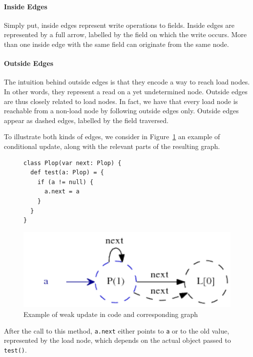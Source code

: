 \paragraph{Inside Edges} Simply put, inside edges represent write operations to
fields. Inside edges are represented by a full arrow, labelled by the field on
which the write occurs. More than one inside edge with the same field can
originate from the same node.

\paragraph{Outside Edges} The intuition behind outside edges is that they
encode a way to reach load nodes. In other words, they represent a read on a
yet undetermined node. Outside edges are thus closely related to load nodes. In
fact, we have that every load node is reachable from a non-load node by
following outside edges only. Outside edges appear as dashed edges, labelled by
the field traversed.

To illustrate both kinds of edges, we consider in Figure~\ref{fig:pt:weak1graph} an
example of conditional update, along with the relevant parts of the resulting graph.
\begin{figure}[h]
\begin{minipage}[tl]{0.6\linewidth}
    \centering
\lstset{linewidth=0.6\linewidth}
\begin{lstlisting}
class Plop(var next: Plop) {
  def test(a: Plop) = {
    if (a != null) {
      a.next = a
    }
  }
}
\end{lstlisting}
\end{minipage}
\begin{minipage}[tr]{0.5\linewidth}
    \centering
    \includegraphics[scale=0.8]{images/pt_weak1graph}
\end{minipage}
    \caption{Example of weak update in code and corresponding graph}
    \label{fig:pt:weak1graph}
\end{figure}
After the call to this method, \verb/a.next/ either points to \verb/a/ or to
the old value, represented by the load node, which depends on the actual object
passed to \verb/test()/.

